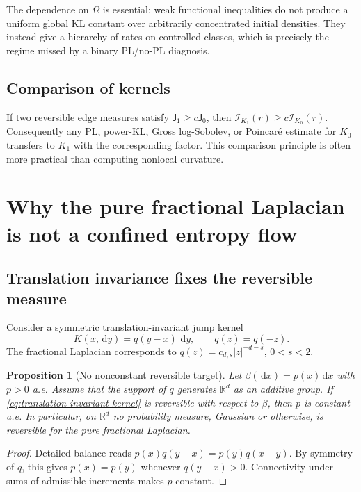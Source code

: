 \documentclass[11pt]{article}
\newtheorem{proposition}[theorem]{Proposition}
\theoremstyle{definition}
\newcommand{\R}{\mathbb R}
\newcommand{\dd}{\,\mathrm d}
\newcommand{\cI}{\mathcal I}
\newcommand{\Jm}{\mathsf J}
\newcommand{\abs}[1]{\left\lvert #1\right\rvert}
\begin{document}
The dependence on $\Omega$ is essential: weak functional inequalities do not
produce a uniform global KL constant over arbitrarily concentrated initial
densities.  They instead give a hierarchy of rates on controlled classes,
which is precisely the regime missed by a binary PL/no-PL diagnosis.

\subsection{Comparison of kernels}

If two reversible edge measures satisfy
$\Jm_1\geq c\Jm_0$, then
$\cI_{K_1}(r)\geq c\cI_{K_0}(r)$.  Consequently any PL, power-KL, Gross
log-Sobolev, or Poincar\'e estimate for $K_0$ transfers to $K_1$ with the
corresponding factor.  This comparison principle is often more practical
than computing nonlocal curvature.

\section{Why the pure fractional Laplacian is not a confined entropy flow}

\subsection{Translation invariance fixes the reversible measure}

Consider a symmetric translation-invariant jump kernel
\begin{equation}\label{eq:translation-invariant-kernel}
  K(x,\dd y)=q(y-x)\,\dd y,
  \qquad q(z)=q(-z).
\end{equation}
The fractional Laplacian corresponds to
$q(z)=c_{d,s}\abs z^{-d-s}$, $0<s<2$.

\begin{proposition}[No nonconstant reversible target]
\label{prop:translation-invariant-reversibility}
Let $\beta(\dd x)=p(x)\dd x$ with $p>0$ a.e.  Assume that the support of
$q$ generates $\R^d$ as an additive group.  If
\eqref{eq:translation-invariant-kernel} is reversible with respect to
$\beta$, then $p$ is constant a.e.  In particular, on $\R^d$ no probability
measure, Gaussian or otherwise, is reversible for the pure fractional
Laplacian.
\end{proposition}

\begin{proof}
Detailed balance reads
$p(x)q(y-x)=p(y)q(x-y)$.  By symmetry of $q$, this gives $p(x)=p(y)$
whenever $q(y-x)>0$.  Connectivity under sums of admissible increments makes
$p$ constant.
\end{proof}
\end{document}
